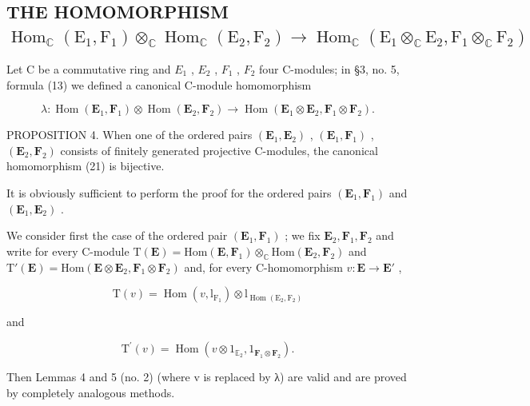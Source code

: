\subsection{\texorpdfstring{THE HOMOMORPHISM \(\operatorname{Hom}_{\mathbb{C}}(\mathrm{E}_1, \mathrm{F}_1) \otimes_{\mathbb{C}} \operatorname{Hom}_{\mathbb{C}}(\mathrm{E}_2, \mathrm{F}_2) \to \operatorname{Hom}_{\mathbb{C}}(\mathrm{E}_1 \otimes_{\mathbb{C}} \mathrm{E}_2, \mathrm{F}_1 \otimes_{\mathbb{C}} \mathrm{F}_2)\)}{The homomorphism from Hom over C of E1,F1 tensor Hom over C of E2,F2 to Hom over C of the corresponding tensor products}}

Let C be a commutative ring and \(E_{1}\) , \(E_{2}\) , \(F_{1}\) , \(F_{2}\) four C-modules; in §3, no. 5, formula (13) we defined a canonical C-module homomorphism

\[
\lambda : \operatorname{Hom} (\mathbf {E} _ {1}, \mathbf {F} _ {1}) \otimes \operatorname{Hom} (\mathbf {E} _ {2}, \mathbf {F} _ {2}) \to \operatorname{Hom} (\mathbf {E} _ {1} \otimes \mathbf {E} _ {2}, \mathbf {F} _ {1} \otimes \mathbf {F} _ {2}). \tag {21}
\]

PROPOSITION 4. When one of the ordered pairs \((\mathbf{E}_1, \mathbf{E}_2)\) , \((\mathbf{E}_1, \mathbf{F}_1)\) , \((\mathbf{E}_2, \mathbf{F}_2)\) consists of finitely generated projective C-modules, the canonical homomorphism (21) is bijective.

It is obviously sufficient to perform the proof for the ordered pairs \((\mathbf{E}_{1}, \mathbf{F}_{1})\) and \((\mathbf{E}_{1}, \mathbf{E}_{2})\) .

We consider first the case of the ordered pair \((\mathbf{E}_1, \mathbf{F}_1)\) ; we fix \(\mathbf{E}_2, \mathbf{F}_1, \mathbf{F}_2\) and write for every C-module \(\mathrm{T}(\mathbf{E}) = \mathrm{Hom}(\mathbf{E}, \mathbf{F}_1) \otimes_{\mathbb{C}} \mathrm{Hom}(\mathbf{E}_2, \mathbf{F}_2)\) and \(\mathrm{T}'(\mathbf{E}) = \mathrm{Hom}(\mathbf{E} \otimes \mathbf{E}_2, \mathbf{F}_1 \otimes \mathbf{F}_2)\) and, for every C-homomorphism \(v: \mathbf{E} \to \mathbf{E}'\) ,

\[
\mathrm{T} (v) = \operatorname{Hom} (v, \mathrm{l} _ {\mathrm{F} _ {1}}) \otimes \mathrm{l} _ {\operatorname{Hom} (\mathrm{E} _ {2}, \mathrm{F} _ {2})}
\]

and

\[
\mathrm{T} ^ {\prime} (v) = \operatorname{Hom} (v \otimes 1 _ {\mathbb {E} _ {2}}, 1 _ {\mathbf {F} _ {1} \otimes \mathbf {F} _ {2}}).
\]

Then Lemmas 4 and 5 (no. 2) (where v is replaced by λ) are valid and are proved by completely analogous methods.

